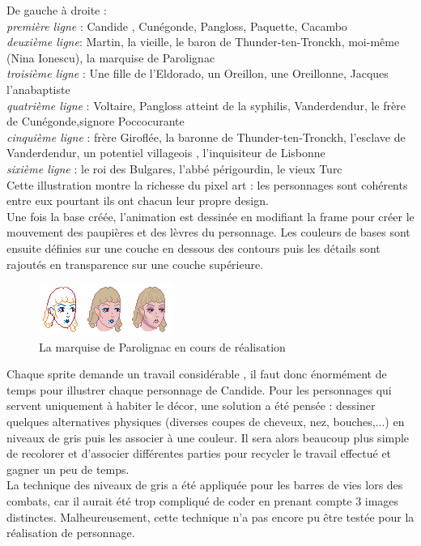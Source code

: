 \documentclass[11pt]{article}
\begin{document}
De gauche à droite :\\\textit{première ligne} : Candide , Cunégonde, Pangloss, Paquette, Cacambo\\
\textit{deuxième ligne}: Martin, la vieille, le baron de Thunder-ten-Tronckh, moi-même (Nina Ionescu), la marquise de Parolignac\\
\textit{troisième ligne} :  Une fille de l'Eldorado, un Oreillon, une Oreillonne, Jacques l'anabaptiste\\
\textit{quatrième ligne} : Voltaire, Pangloss atteint de la syphilis, Vanderdendur, le frère de Cunégonde,signore Poccocurante\\
\textit{cinquième ligne} : frère Giroflée, la baronne de Thunder-ten-Tronckh, l'esclave de Vanderdendur, un potentiel villageois , l'inquisiteur de Lisbonne \\
\textit{sixième ligne} : le roi des Bulgares, l'abbé périgourdin, le vieux Turc\\

Cette illustration montre la richesse du pixel art : les personnages sont cohérents entre eux pourtant ils ont chacun leur propre design.\\

Une fois la base créée, l'animation est dessinée en modifiant la frame pour créer le mouvement des paupières et des lèvres du personnage. Les couleurs de bases sont ensuite définies sur une couche en dessous des contours puis les détails sont rajoutés en transparence sur une couche supérieure. 
\begin{figure}[H]
\includegraphics[scale=1.5]{exempleTM}
\centering
\caption{La marquise de Parolignac en cours de réalisation}
\end{figure}

Chaque sprite demande un travail considérable , il faut donc énormément de temps pour illustrer chaque personnage de Candide. Pour les personnages qui servent uniquement à habiter le décor, une solution a été pensée : dessiner quelques alternatives physiques (diverses coupes de cheveux, nez, bouches,...) en niveaux de gris puis les associer à une couleur. Il sera alors beaucoup plus simple de recolorer et d'associer différentes parties pour recycler le travail effectué et gagner un peu de temps.\\
La technique des niveaux de gris a été appliquée pour les barres de vies lors des combats, car il aurait été trop compliqué de coder en prenant compte 3 images distinctes. Malheureusement, cette technique n'a pas encore pu être testée pour la réalisation de personnage.
\end{document}
